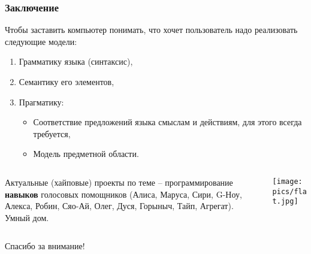 \documentclass[10pt]{beamer}
\begin{document}
\begin{frame}
  \frametitle{Заключение}
  Чтобы заставить компьютер понимать, что хочет пользователь надо реализовать следующие модели:
  \begin{enumerate}
  \item Грамматику языка (синтаксис),
  \item Семантику его элементов,
  \item Прагматику:
    \begin{itemize}
    \item Соответствие предложений языка смыслам и действиям, для этого всегда требуется,
    \item Модель предметной области.
    \end{itemize}
  \end{enumerate}
  \begin{columns}
    \begin{column}{0.5\linewidth}
      Актуальные (хайповые) проекты по теме -- программирование \textbf{навыков} голосовых помощников (Алиса, Маруса, Сири, G-Ноу, Алекса, Робин, Сяо-Ай, Олег, Дуся, Горыныч, Тайп, Агрегат).\\[1em]
      Умный дом.
    \end{column}
    \begin{column}{0.6\linewidth}
      \texttt{[image: pics/flat.jpg]}
    \end{column}
  \end{columns}
\end{frame}


\begin{frame}
  \vfill
  \begin{center}
    {\Huge Спасибо за внимание!}
  \end{center}
  \vfill
\end{frame}
\end{document}
